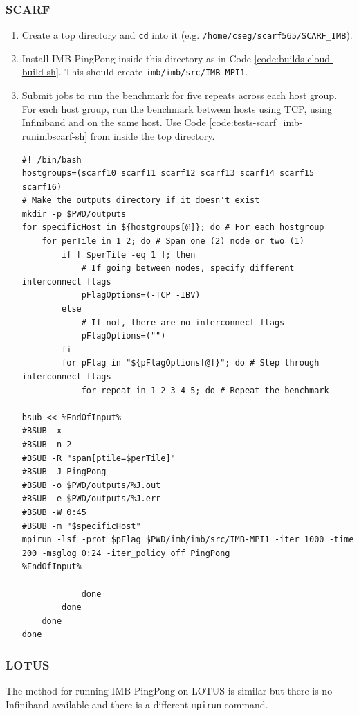 \documentclass{article}
\newenvironment{code}{\captionsetup{type=listing}}{}
\begin{document}
        \subsubsection{SCARF}
            \begin{enumerate}
                \item Create a top directory and \verb|cd| into it (e.g. \verb|/home/cseg/scarf565/SCARF_IMB|).
                \item Install IMB PingPong inside this directory as in Code \ref{code:builds-cloud-build-sh}. This should create \verb|imb/imb/src/IMB-MPI1|.
                \item Submit jobs to run the benchmark for five repeats across each host group. For each host group, run the benchmark between hosts using TCP, using Infiniband and on the same host. Use Code \ref{code:tests-scarf_imb-runimbscarf-sh} from inside the top directory.
                    \begin{code}
                    \label{code:tests-scarf_imb-runimbscarf-sh}
                    \begin{verbatim}
#! /bin/bash
hostgroups=(scarf10 scarf11 scarf12 scarf13 scarf14 scarf15 scarf16)
# Make the outputs directory if it doesn't exist
mkdir -p $PWD/outputs
for specificHost in ${hostgroups[@]}; do # For each hostgroup
    for perTile in 1 2; do # Span one (2) node or two (1)
        if [ $perTile -eq 1 ]; then
            # If going between nodes, specify different interconnect flags
            pFlagOptions=(-TCP -IBV)
        else
            # If not, there are no interconnect flags
            pFlagOptions=("")
        fi
        for pFlag in "${pFlagOptions[@]}"; do # Step through interconnect flags
            for repeat in 1 2 3 4 5; do # Repeat the benchmark

bsub << %EndOfInput%
#BSUB -x
#BSUB -n 2
#BSUB -R "span[ptile=$perTile]"
#BSUB -J PingPong
#BSUB -o $PWD/outputs/%J.out
#BSUB -e $PWD/outputs/%J.err
#BSUB -W 0:45
#BSUB -m "$specificHost"
mpirun -lsf -prot $pFlag $PWD/imb/imb/src/IMB-MPI1 -iter 1000 -time 200 -msglog 0:24 -iter_policy off PingPong
%EndOfInput%

            done
        done
    done
done
                \end{verbatim}
                \end{code}
            \end{enumerate}
        \subsubsection{LOTUS}
            The method for running IMB PingPong on LOTUS is similar but there is no Infiniband available and there is a different \verb|mpirun| command.
\end{document}
